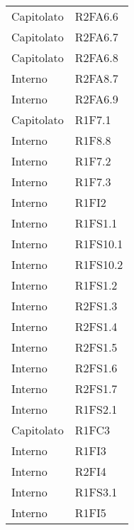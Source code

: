 {\begin{longtable}{ C{4cm} C{4cm}}
Capitolato & R2FA6.6\\

Capitolato & R2FA6.7\\

Capitolato & R2FA6.8\\


Interno & R2FA8.7\\

Interno & R2FA6.9\\

Capitolato & R1F7.1\\

Interno & R1F8.8\\

Interno & R1F7.2\\

Interno & R1F7.3\\

Interno & R1FI2\\

Interno & R1FS1.1\\

Interno & R1FS10.1\\


Interno & R1FS10.2\\

Interno & R1FS1.2\\

Interno & R2FS1.3\\

Interno & R2FS1.4\\

Interno & R2FS1.5\\

Interno & R2FS1.6\\

Interno & R2FS1.7\\

Interno & R1FS2.1\\

Capitolato & R1FC3\\

Interno & R1FI3\\

Interno & R2FI4\\

Interno & R1FS3.1\\

Interno & R1FI5\\


\end{longtable}}
